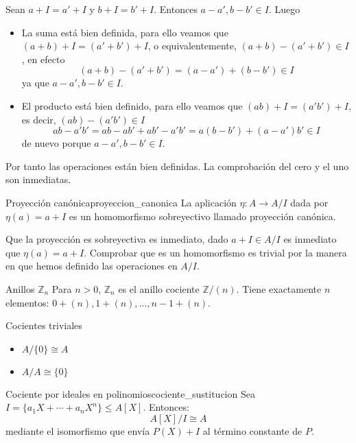 \begin{proofbox}
    Sean \(a + I = a' + I\) y \(b + I = b' + I\). Entonces \(a - a', b - b' \in I\). Luego
    \begin{itemize}
        \item La suma está bien definida, para ello veamos que $(a+b) + I = (a' + b') + I$, o equivalentemente, $(a + b) - (a' + b') \in I$, en efecto
        \[
        (a + b) - (a' + b') = (a - a') + (b - b') \in I
        \]
        ya que $a - a', b - b' \in I$.
        \item El producto está bien definido, para ello veamos que $(ab) + I = (a'b') + I$, es decir, $(ab) - (a'b') \in I$
        \[
        ab - a'b' = ab - ab' + ab' - a'b' = a(b - b') + (a - a')b' \in I
        \]
        de nuevo porque $a - a', b - b' \in I$.
    \end{itemize}
    Por tanto las operaciones están bien definidas. La comprobación del cero y el uno son inmediatas.
\end{proofbox}

\begin{definition}{Proyección canónica}{proyeccion_canonica}
    La aplicación \(\eta: A \to A/I\) dada por \(\eta(a) = a + I\) es un homomorfismo sobreyectivo llamado {proyección canónica}.
\end{definition}

\begin{proofbox}
    Que la proyección es sobreyectiva es inmediato, dado $a + I \in A/I$ es inmediato que $\eta(a) = a + I$. Comprobar que es un homomorfismo es trivial por la manera en que hemos definido las operaciones en $A/I$.
\end{proofbox}

\begin{example}{Anillos \(\mathbb{Z}_n\)}{}
    Para \(n > 0\), \(\mathbb{Z}_n\)  es el anillo cociente \(\mathbb{Z}/(n)\). Tiene exactamente \(n\) elementos: \(0 + (n), 1 + (n), \ldots, n-1 + (n)\).
\end{example}

\begin{example}{Cocientes triviales}{}
    \begin{itemize}
        \item \(A/\{0\} \cong A\)
        \item \(A/A \cong \{0\}\)
    \end{itemize}
\end{example}

\begin{example}{Cociente por ideales en polinomios}{cociente_sustitucion}
    Sea \(I = \{a_1X + \cdots + a_nX^n\} \leq A[X]\). Entonces:
    \[
    A[X]/I \cong A
    \]
    mediante el isomorfismo que envía \(P(X) + I\) al término constante de \(P\).
\end{example}

